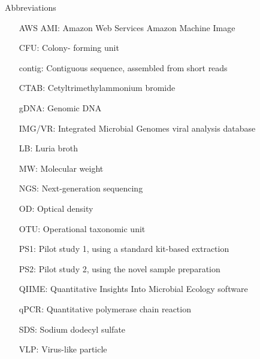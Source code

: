 \documentclass[oneside,12pt,final]{sty/ucthesis-CA2012}
\begin{document}
\begin{mainmatter}
\clearpage
\begin{section}{Abbreviations} 
\begin{itemize}
\item[AWS AMI:]	Amazon Web Services Amazon Machine Image
\item[CFU:]	Colony- forming unit
\item[contig:]	Contiguous sequence, assembled from short reads
\item[CTAB:]	Cetyltrimethylammonium bromide
\item[gDNA:]	Genomic DNA
\item[IMG/VR:]	Integrated Microbial Genomes viral analysis database
\item[LB:]	Luria broth
\item[MW:]	Molecular weight
\item[NGS:]	Next-generation sequencing
\item[OD:]	Optical density
\item[OTU:]	Operational taxonomic unit
\item[PS1:]	Pilot study 1, using a standard kit-based extraction
\item[PS2:]	Pilot study 2, using the novel sample preparation
\item[QIIME:]	Quantitative Insights Into Microbial Ecology software
\item[qPCR:]	Quantitative polymerase chain reaction
\item[SDS:]	Sodium dodecyl sulfate
\item[VLP:]	Virus-like particle
\end{itemize}

\end{section}
\end{mainmatter}

\ssp


\end{document}
